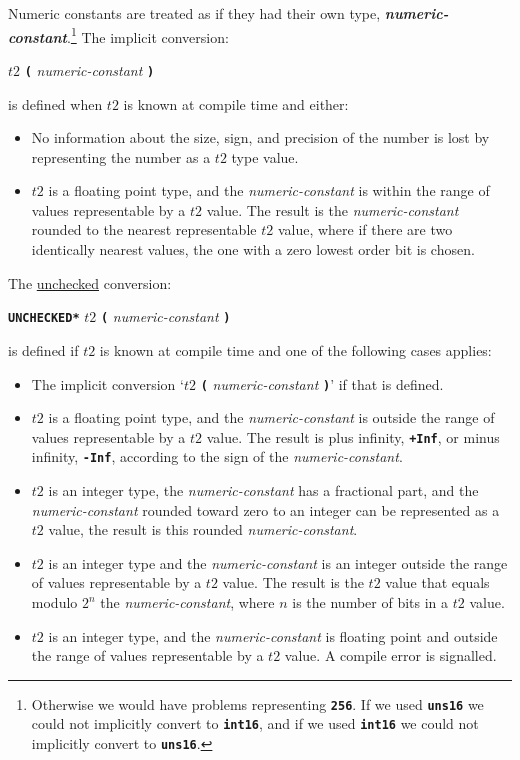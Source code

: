 \documentclass[12pt]{article}
\newcommand{\TT}[1]{{\tt \bfseries #1}}
\newcommand{\key}[1]{{\bf \em #1}\index{#1}}
\begin{document}
Numeric constants are treated as if they had their own type,
\key{numeric-constant}.\footnote{Otherwise we would have problems
representing \TT{256}.  If we used \TT{uns16} we could not implicitly
convert to \TT{int16}, and if we used \TT{int16} we could not implicitly
convert to \TT{uns16}.}
The implicit conversion:
\begin{center}
$t2$ \TT{(} {\em numeric-constant} \TT{)}
\end{center}
is defined when $t2$ is known at compile time and either:
\begin{itemize}
\item No information about the size, sign, and
precision of the number is lost by representing the number
as a $t2$ type value.
\item $t2$ is a floating point type,
and the {\em numeric-constant} is within the range of values representable
by a $t2$ value.  The result is the {\em numeric-constant} rounded to
the nearest representable $t2$ value, where if there are two identically
nearest values, the one with a zero lowest order bit is chosen.
\end{itemize}

The \underline{unchecked} conversion:
\begin{center}
\TT{*UNCHECKED*} $t2$ \TT{(} {\em numeric-constant} \TT{)}
\end{center}
is defined if $t2$ is known at compile time
and one of the following cases applies:
\begin{itemize}
\item The implicit conversion `$t2$ \TT{(} {\em numeric-constant} \TT{)}'
if that is defined.
\item $t2$ is a floating point type,
and the {\em numeric-constant} is outside the range of values representable
by a $t2$ value.
The result is plus infinity, \TT{+Inf}, or minus infinity, \TT{-Inf},
according to the sign of the {\em numeric-constant}.
\item $t2$ is an integer type, the {\em numeric-constant}
has a fractional part, and
the {\em numeric-constant} rounded toward zero to an integer
can be represented as a $t2$ value,
the result is this rounded {\em numeric-constant}.
\item $t2$ is an integer type
and the {\em numeric-constant} is an integer
outside the range of values representable
by a $t2$ value.
The result is the $t2$ value that
equals modulo $2^n$ the {\em numeric-constant}, where $n$ is the
number of bits in a $t2$ value.
\item $t2$ is an integer type,
and the {\em numeric-constant} is floating point and
outside the range of values representable
by a $t2$ value.
A compile error is signalled.
\end{itemize}
\end{document}
